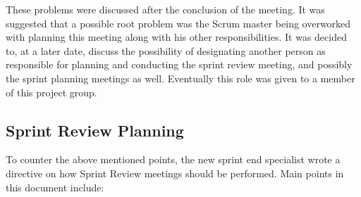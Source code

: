 These problems were discussed after the conclusion of the meeting. 
It was suggested that a possible root problem was the \giraf Scrum master being overworked with planning this meeting along with his other responsibilities.
It was decided to, at a later date, discuss the possibility of designating another person as responsible for planning and conducting the sprint review meeting, and possibly the sprint planning meetings as well. Eventually this role was given to a member of this project group.

\subsection{Sprint Review Planning}
\label{collab:sprintend:planning}
To counter the above mentioned points, the new sprint end specialist wrote a directive on how Sprint Review meetings should be performed. Main points in this document include:
